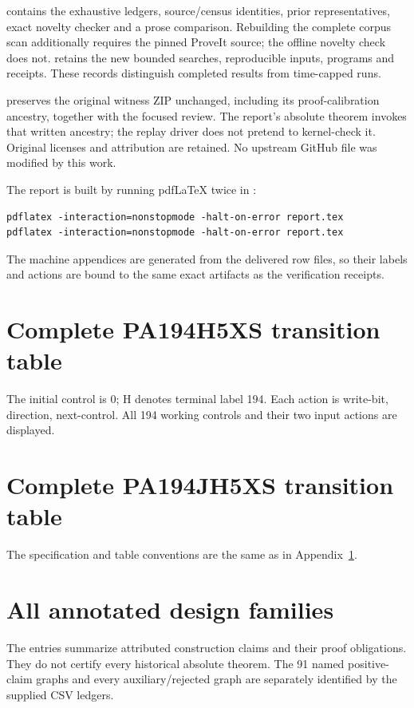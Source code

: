 \documentclass[10pt,letterpaper]{article}
\newcommand{\file}[1]{\path{#1}}
\begin{document}
\file{comparison/} contains the exhaustive ledgers, source/census
identities, prior representatives, exact novelty checker and a prose
comparison.  Rebuilding the complete corpus scan additionally requires
the pinned ProveIt source; the offline novelty check does not.
\file{research/} retains the new bounded searches, reproducible inputs,
programs and receipts.  These records distinguish completed results
from time-capped runs.

\file{references/} preserves the original witness ZIP unchanged,
including its proof-calibration ancestry, together with the focused
review.  The report's absolute theorem invokes that written ancestry;
the replay driver does not pretend to kernel-check it.  Original
licenses and attribution are retained.  No upstream GitHub file was
modified by this work.

The report is built by running pdfLaTeX twice in \file{report/}:
\begin{verbatim}
pdflatex -interaction=nonstopmode -halt-on-error report.tex
pdflatex -interaction=nonstopmode -halt-on-error report.tex
\end{verbatim}
The machine appendices are generated from the delivered row files, so
their labels and actions are bound to the same exact artifacts as the
verification receipts.

\appendix
\clearpage
\section{Complete PA194H5XS transition table}
\label{app:h5xs}
The initial control is 0; H denotes terminal label 194.  Each action
is write-bit, direction, next-control.  All 194 working controls and
their two input actions are displayed.


\clearpage
\section{Complete PA194JH5XS transition table}
The specification and table conventions are the same as in
Appendix~\ref{app:h5xs}.


\clearpage
\section{All annotated design families}
\label{app:families}
The entries summarize attributed construction claims and their proof
obligations.  They do not certify every historical absolute theorem.
The 91 named positive-claim graphs and every auxiliary/rejected graph
are separately identified by the supplied CSV ledgers.

\end{document}
